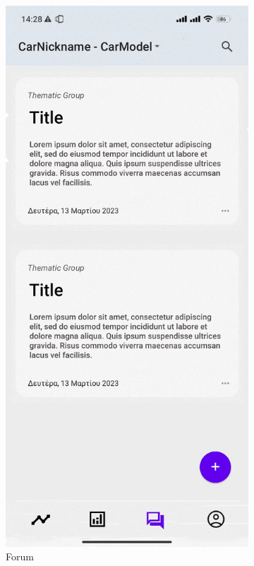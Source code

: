 \documentclass[11pt]{scrartcl} %
\begin{document}
\begin{figure}[!htb]
\begin{subfigure}{.5\textwidth}
  \includegraphics[width=.6\linewidth]{assets/forum_mock_up.jpg}
  \caption{Forum}
  \label{fig:sfig3}
\end{subfigure}
\label{fig:fig}
\begin{subfigure}{.5\textwidth}
  \centering

\end{subfigure}
\end{figure}
\end{document}
